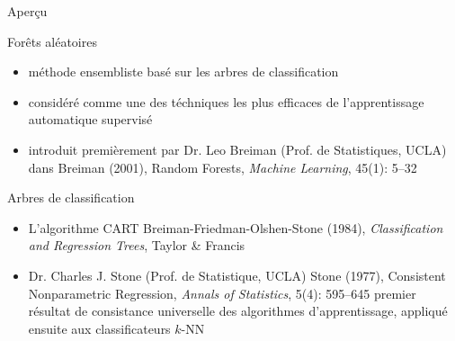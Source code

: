 

\begin{frame}{\LARGE Aper\c{c}u}

\vskip 0.3cm

\scriptsize
{\large For\^{e}ts al\'{e}atoires}
\vskip 0.05cm
\begin{itemize}
\item
	m\'ethode ensembliste bas\'e sur les arbres de classification

\vskip 0.25cm
\item
	consid\'er\'e comme une des t\'echniques les plus efficaces
	de l'apprentissage automatique supervis\'e

\vskip 0.25cm
\item
	introduit premi\`erement par Dr. Leo Breiman (Prof. de Statistiques, UCLA) dans
	\vskip 0.05cm
	Breiman (2001), Random Forests, \textit{Machine Learning}, 45(1): 5--32

\end{itemize}

\vskip 0.3cm
{\large Arbres de classification}
\vskip 0.05cm
\begin{itemize}
\item
	L'algorithme CART
	\vskip 0.05cm
	Breiman-Friedman-Olshen-Stone (1984),
	\textit{{\color{red}C}lassification {\color{red}a}nd {\color{red}R}egression {\color{red}T}rees},
	Taylor \& Francis

\vskip 0.25cm
\item
	Dr. Charles J. Stone (Prof. de Statistique, UCLA)
	\vskip 0.05cm
	Stone (1977), Consistent Nonparametric Regression, \textit{Annals of Statistics}, 5(4): 595--645
	\vskip 0.02cm
	{\tiny premier r\'esultat de consistance universelle des algorithmes d'apprentissage,
	appliqu\'e ensuite aux classificateurs $k$-NN}

\end{itemize}

\end{frame}
\normalsize

